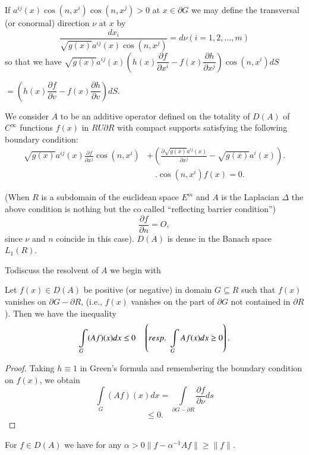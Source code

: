 \begin{remark*}%
 If $a^{ij}(x)\cos (n,x^i)\cos (n,x^j)>0$ at $x \in \partial G$ we
 may define the transversal (or conormal) direction $\nu$ at $x$ by 
 $$
 \frac{dx_i}{\sqrt{g(x)}a^{ij}(x)\cos (n,x^j)}= d \nu (i=1,2, \ldots, m)
 $$
 so that we have
 $\sqrt{g(x)}a^{ij}(x)(h(x)\dfrac{\partial f}{\partial
  x^i}-f(x)\dfrac{\partial h}{\partial x^j}) \cos (n,x^i)dS$ 
 
 $=(h(x)\dfrac{\partial f}{\partial v}-f(x)\dfrac{\partial
  h}{\partial v}) dS$. 
\end{remark*}

We consider $A$ to be an additive operator defined on the totality of
$D(A)$ of $C^\infty$ functions $f(x)$ in $R U \partial R$ with compact
supports satisfying the following boundary condition: 
\begin{align*}
 \sqrt{g(x)}a^{ij}(x)\frac{\partial f}{\partial x^j}\cos
 (n,x^i) & + \left(\frac{\partial \sqrt{g(x)} a^{ij} (x)}{\partial x^j}
 -\sqrt{g(x)} a^i(x)\right).\\ 
 &\quad . \cos (n,x^i) f(x) =0.
\end{align*}

(When $R$ is a subdomain of the euclidean space $E^m$ and $A$ is the
Laplacian $\Delta$ the above condition is nothing but the co called
``reflecting barrier condition'')  
$$
\frac{\partial f}{\partial n}=O,
$$
since $\nu$ and $n$ coincide in this case). $D(A)$ is dense in the
Banach space $L_1(R)$. 

To\pageoriginale discuss the resolvent of $A$ we begin with
\setcounter{Lemma}{0}
\begin{Lemma}\label{chap21:sec1:lem1}%
 Let $f(x)\in D(A)$ be positive (or negative) in domain $G \subseteq R$
 such that $f(x)$ vanishes on $\partial G-\partial R$, (i.e., $f(x)$
 vanishes on the part of $\partial G$ not contained in $\partial
 R$). Then we have the inequality 
 $$
 \int \limits_G (Af)(x)dx \leq 0 \quad \left({resp.}\kern.3em \int \limits_G
 Af(x)dx \geq 0\right). 
 $$
\end{Lemma}

\begin{proof}
 Taking $h \equiv 1$ in Green's formula and remembering the boundary
 condition on $f(x)$, we obtain 
 $$
 \int \limits_G (Af)(x)dx= \int \limits_{\partial G-\partial R}
 \frac{\partial f}{\partial \nu}ds 
 $$
 $$
 \leq 0.
 $$
\end{proof}

\begin{coro*}%
 For $f \in D(A)$ we have for any $\alpha >0 \parallel f-
 \alpha^{-1}Af \parallel \geq \parallel f \parallel$. 
\end{coro*}

